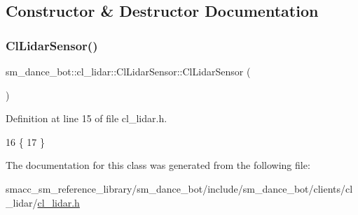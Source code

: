 \subsection{Constructor \& Destructor Documentation}
\mbox{\label{classsm__dance__bot_1_1cl__lidar_1_1ClLidarSensor_a1d3da358f132075aa25d4e647fc93924}} 
\subsubsection{\texorpdfstring{Cl\+Lidar\+Sensor()}{ClLidarSensor()}}
{\footnotesize\ttfamily sm\+\_\+dance\+\_\+bot\+::cl\+\_\+lidar\+::\+Cl\+Lidar\+Sensor\+::\+Cl\+Lidar\+Sensor (\begin{DoxyParamCaption}{ }\end{DoxyParamCaption})\hspace{0.3cm}{\ttfamily [inline]}}



Definition at line 15 of file cl\+\_\+lidar.\+h.


\begin{DoxyCode}
16     \{
17     \}
\end{DoxyCode}


The documentation for this class was generated from the following file\+:\begin{DoxyCompactItemize}
\item 
smacc\+\_\+sm\+\_\+reference\+\_\+library/sm\+\_\+dance\+\_\+bot/include/sm\+\_\+dance\+\_\+bot/clients/cl\+\_\+lidar/\hyperlink{include_2sm__dance__bot_2clients_2cl__lidar_2cl__lidar_8h}{cl\+\_\+lidar.\+h}\end{DoxyCompactItemize}
